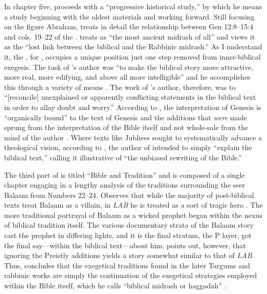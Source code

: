 In chapter five, \vermes proceeds with a ``progressive
historical study,'' by which he means a study beginning with the oldest
materials and working forward. Still focusing on the figure Abraham,
\vermes treats in detail the relationship between Gen
12:8--15:4 and cols. 19--22 of the \ga.
\vermes treats \ga as ``the most ancient
midrash of all''\autocite[124]{vermes1961} and views it as the ``lost
link between the biblical and the Rabbinic midrash.''
\autocite[124]{vermes1961} As I understand it, the \ga,
for \vermes, occupies a unique position just one step
removed from inner-biblical exegesis. The task of \ga's
author was ``to make the biblical story more attractive, more real, more
edifying, and above all more intelligible'' and he accomplishes this
through a variety of means \autocite[125]{vermes1961}. The work of
\ga's author, therefore, was to ``{[}reconcile{]}
unexplained or apparently conflicting statements in the biblical text in
order to allay doubt and worry.''\autocite[125]{vermes1961} According to
\vermes, the interpretation of Genesis is ``organically
bound'' to the text of Genesis and the additions that \emph{were} made
sprung from the interpretation of the Bible itself and not whole-sale
from the mind of the author \autocite[126]{vermes1961}. Where texts like
Jubliees sought to systematically advance a theological vision,
according to \vermes, the author of \ga
intended to simply ``explain the biblical text,'' calling it
illustrative of ``the unbiased rewriting of the
Bible.''\autocite[126]{vermes1961}

The third part of  is titled ``Bible and Tradition''
and is composed of a single chapter engaging in a lengthy analysis of
the traditions surrounding the seer Balaam from Numbers 22--24.
\vermes Observes that while the majority of
post-biblical texts treat Balaam as a villain, in \emph{LAB} he is
treated as a sort of tragic hero \autocite[173]{vermes1961}. The more
traditional portrayal of Balaam as a wicked prophet began within the
nexus of biblical tradition itself. The various documentary strata of
the Balaam story cast the prophet in differing lights, and it is the
final stratum, the P layer, got the final say---within the biblical
text---about him. \vermes points out, however, that
ignoring the Preistly additions yields a story somewhat similar to that
of \emph{LAB}. Thus, \vermes concludes that the
exegetical traditions found in the later Targums and rabbinic works are
simply the continuation of the exegetical strategies employed within the
Bible itself, which he calls ``biblical midrash or haggadah''
\autocite[176]{vermes1961}.

